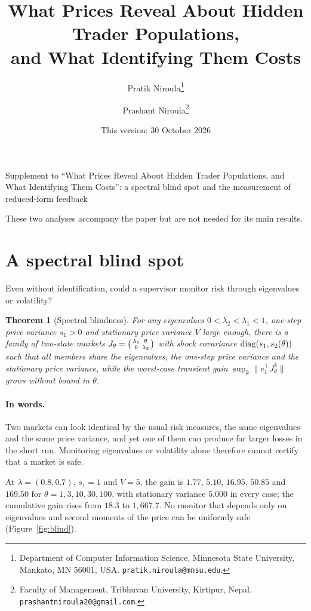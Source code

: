 \documentclass[12pt]{article}
\title{What Prices Reveal About Hidden Trader Populations,\\ and What Identifying Them Costs}
\author{Pratik Niroula\thanks{Department of Computer Information Science, Minnesota State University, Mankato, MN 56001, USA. \texttt{pratik.niroula@mnsu.edu}.}
\and Prashant Niroula\thanks{Faculty of Management, Tribhuvan University, Kirtipur, Nepal. \texttt{prashantniroula20@gmail.com}.}}
\date{This version: 30 October 2026}
\newtheorem{theorem}{Theorem}[section]
\theoremstyle{definition}
\theoremstyle{remark}
\begin{document}
\begin{center}\large Supplement to ``What Prices Reveal About Hidden Trader Populations, and What Identifying Them Costs'': a spectral blind spot and the measurement of reduced-form feedback\end{center}
\renewcommand{\thesection}{S\arabic{section}}\renewcommand{\thetable}{S\arabic{table}}\renewcommand{\thefigure}{S\arabic{figure}}\renewcommand{\theequation}{S\arabic{equation}}
These two analyses accompany the paper but are not needed for its main results.

\section{A spectral blind spot}\label{sec:blind}

Even without identification, could a supervisor monitor risk through eigenvalues or volatility?

\begin{theorem}[Spectral blindness]\label{thm:blind}
For any eigenvalues $0<\lambda_2<\lambda_1<1$, one-step price variance $s_1>0$ and stationary price variance $V$ large enough, there is a family of two-state markets $J_\theta=\begin{psmallmatrix}\lambda_1&\theta\\0&\lambda_2\end{psmallmatrix}$ with shock covariance ${\rm diag}(s_1,s_2(\theta))$ such that all members share the eigenvalues, the one-step price variance and the stationary price variance, while the worst-case transient gain $\sup_k\|e_1^\top J_\theta^k\|$ grows without bound in $\theta$.
\end{theorem}

\paragraph{In words.} Two markets can look identical by the usual risk measures, the same eigenvalues and the same price variance, and yet one of them can produce far larger losses in the short run. Monitoring eigenvalues or volatility alone therefore cannot certify that a market is safe.

At $\lambda=(0.8,0.7)$, $s_1=1$ and $V=5$, the gain is $1.77$, $5.10$, $16.95$, $50.85$ and $169.50$ for $\theta=1,3,10,30,100$, with stationary variance $5.000$ in every case; the cumulative gain rises from $18.3$ to $1{,}667.7$. No monitor that depends only on eigenvalues and second moments of the price can be uniformly safe (Figure~\ref{fig:blind}).
\end{document}
